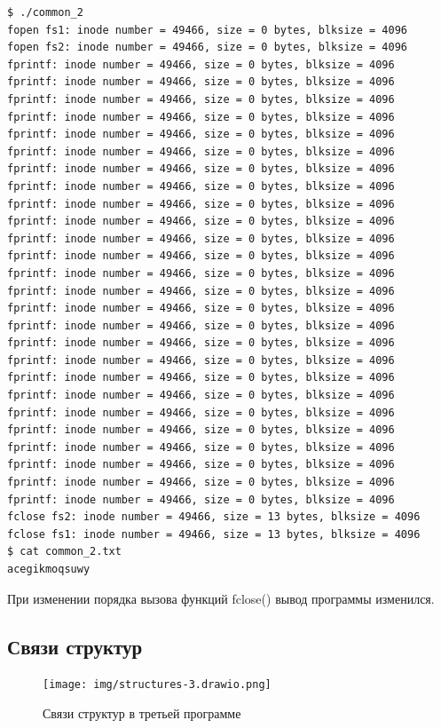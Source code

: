 \documentclass[a4paper,14pt]{extarticle}
\begin{document}
\begin{lstlisting}[caption={\text{Вывод программы}}]
$ ./common_2
fopen fs1: inode number = 49466, size = 0 bytes, blksize = 4096
fopen fs2: inode number = 49466, size = 0 bytes, blksize = 4096
fprintf: inode number = 49466, size = 0 bytes, blksize = 4096
fprintf: inode number = 49466, size = 0 bytes, blksize = 4096
fprintf: inode number = 49466, size = 0 bytes, blksize = 4096
fprintf: inode number = 49466, size = 0 bytes, blksize = 4096
fprintf: inode number = 49466, size = 0 bytes, blksize = 4096
fprintf: inode number = 49466, size = 0 bytes, blksize = 4096
fprintf: inode number = 49466, size = 0 bytes, blksize = 4096
fprintf: inode number = 49466, size = 0 bytes, blksize = 4096
fprintf: inode number = 49466, size = 0 bytes, blksize = 4096
fprintf: inode number = 49466, size = 0 bytes, blksize = 4096
fprintf: inode number = 49466, size = 0 bytes, blksize = 4096
fprintf: inode number = 49466, size = 0 bytes, blksize = 4096
fprintf: inode number = 49466, size = 0 bytes, blksize = 4096
fprintf: inode number = 49466, size = 0 bytes, blksize = 4096
fprintf: inode number = 49466, size = 0 bytes, blksize = 4096
fprintf: inode number = 49466, size = 0 bytes, blksize = 4096
fprintf: inode number = 49466, size = 0 bytes, blksize = 4096
fprintf: inode number = 49466, size = 0 bytes, blksize = 4096
fprintf: inode number = 49466, size = 0 bytes, blksize = 4096
fprintf: inode number = 49466, size = 0 bytes, blksize = 4096
fprintf: inode number = 49466, size = 0 bytes, blksize = 4096
fprintf: inode number = 49466, size = 0 bytes, blksize = 4096
fprintf: inode number = 49466, size = 0 bytes, blksize = 4096
fprintf: inode number = 49466, size = 0 bytes, blksize = 4096
fprintf: inode number = 49466, size = 0 bytes, blksize = 4096
fprintf: inode number = 49466, size = 0 bytes, blksize = 4096
fclose fs2: inode number = 49466, size = 13 bytes, blksize = 4096
fclose fs1: inode number = 49466, size = 13 bytes, blksize = 4096
$ cat common_2.txt
acegikmoqsuwy
\end{lstlisting}

При изменении порядка вызова функций fclose() вывод программы изменился.

\newpage
\subsection{Связи структур}

\begin{figure}[H]
	\centering
	\texttt{[image: img/structures-3.drawio.png]}
	\caption{Связи структур в третьей программе}
\end{figure}
\end{document}
